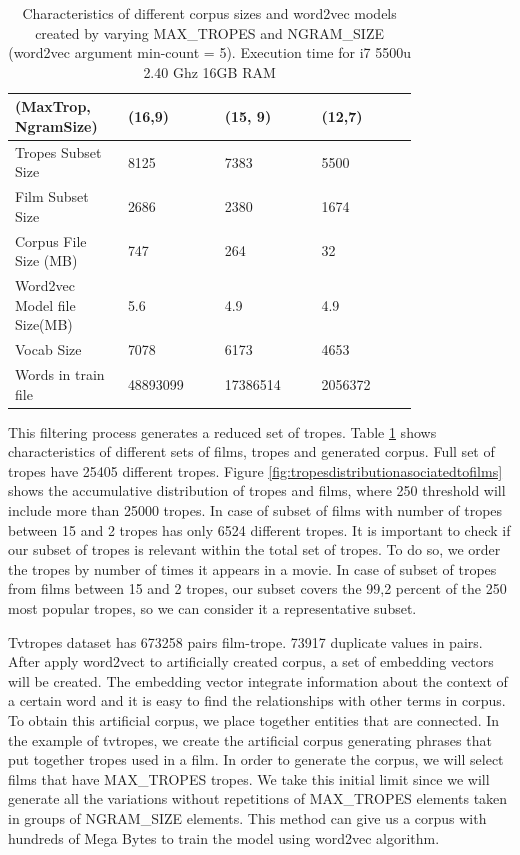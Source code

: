 \documentclass[letterpaper]{article}
\begin{document}
	\begin{table}[t]
		\centering
		\begin{tabular}{|p{0.20\linewidth}|p{0.2\linewidth}|p{0.2\linewidth}|p{0.2\linewidth}|}
			\hline
			\textbf{(MaxTrop, NgramSize)}& \textbf{(16,9)} & \textbf{(15, 9)} & \textbf{(12,7)}\\
			\hline
			\hline
			Tropes Subset Size&8125&7383& 5500\\
			\hline
			Film Subset Size&2686&2380& 1674\\
			\hline
			Corpus File Size (MB)&747&264& 32\\
			\hline
			Word2vec Model file Size(MB)&5.6&4.9&4.9\\
			\hline
			Vocab Size& 7078 & 6173 & 4653\\
			\hline
			Words in train file& 48893099 &17386514&2056372\\
			\hline

		\end{tabular}
		\caption{Characteristics of different corpus sizes and word2vec models created by varying MAX\_TROPES and NGRAM\_SIZE (word2vec argument min-count = 5). Execution time for i7 5500u 2.40 Ghz 16GB RAM}
		\label{tab:corpusSize}
	\end{table}
	
	This filtering process generates a reduced set of tropes. Table \ref{tab:corpusSize} shows characteristics of different sets of films, tropes and generated corpus. Full set of tropes have 25405 different tropes. Figure \ref{fig:tropesdistributionasociatedtofilms} shows the accumulative distribution of tropes and films, where 250 threshold will include more than 25000 tropes. In case of subset of films with number of tropes between 15 and 2 tropes has only 6524 different tropes. 
	It is important to check if our subset of tropes is relevant within the total set of tropes. To do so, we order the tropes by number of times it appears in a movie. In case of subset of tropes from films between 15 and 2 tropes, our subset covers the 99,2 percent of the 250 most popular tropes, so we can consider it a representative subset. 
	
	Tvtropes dataset has 673258 pairs film-trope. 73917 duplicate values in pairs. After apply word2vect to artificially created corpus, a set of embedding vectors will be created. The embedding vector integrate information about the context of a certain word and it is easy to find the relationships with other terms in corpus.\\
	To obtain this artificial corpus, we place together entities that are connected. In the example of tvtropes, we create the artificial corpus generating phrases that put together tropes used in a film. In order to generate the corpus, we will select films that have MAX\_TROPES tropes. We take this initial limit since we will generate all the variations without repetitions of MAX\_TROPES elements taken in groups of NGRAM\_SIZE elements. This method can give us a corpus with hundreds of Mega Bytes to train the model using word2vec algorithm. \\
	
\end{document}
